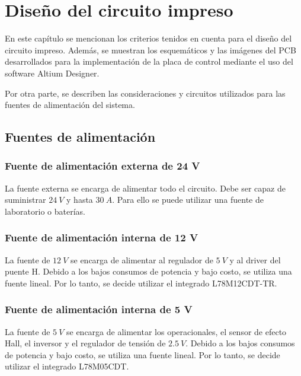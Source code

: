 \chapter{Diseño del circuito impreso}  \label{cap:PCB}

En este capítulo se mencionan los criterios tenidos en cuenta para el diseño del circuito impreso. Además, se muestran los esquemáticos y las imágenes del PCB desarrollados para la implementación de la placa de control mediante el uso del software Altium Designer. 

Por otra parte, se describen las consideraciones y circuitos utilizados para las fuentes de alimentación del sistema.



\section{Fuentes de alimentación}

\subsection{Fuente de alimentación externa de 24 V}

\noindent La fuente externa se encarga de alimentar todo el circuito. Debe ser capaz de suministrar $24\:V$ y hasta $30\:A$. Para ello se puede utilizar una fuente de laboratorio o baterías.

\subsection{Fuente de alimentación interna de 12 V}

\noindent La fuente de $12\:V$ se encarga de alimentar al regulador de $5\:V$ y al driver del puente H. Debido a los bajos consumos de potencia y bajo costo, se utiliza una fuente lineal. Por lo tanto, se decide utilizar el integrado L78M12CDT-TR.

\subsection{Fuente de alimentación interna de 5 V}

La fuente de $5\:V$ se encarga de alimentar los operacionales, el sensor de efecto Hall, el inversor y el regulador de tensión de $2.5\:V$. Debido a los bajos consumos de potencia y bajo costo, se utiliza una fuente lineal. Por lo tanto, se decide utilizar el integrado L78M05CDT.

